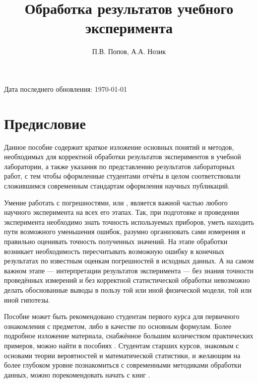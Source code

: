 \documentclass[a5paper,10pt,oneside]{report}
\begin{document}
\title{Обработка результатов учебного эксперимента}
\author{П.В. Попов, А.А. Нозик}

\maketitle


Дата последнего обновления: \today


\tableofcontents

\listoftodos

\chapter*{Предисловие}
    Данное пособие содержит краткое изложение основных понятий и методов,
    необходимых для корректной обработки результатов экспериментов в учебной
    лаборатории, а также указания по представлению результатов лабораторных
    работ, с тем чтобы оформленные студентами отчёты в целом соответствовали
    сложившимся современным стандартам оформления научных публикаций.

    Умение работать с погрешностями, или ,
    является важной частью любого научного эксперимента на всех его этапах.
    Так, при подготовке и проведении эксперимента необходимо знать точность
    используемых приборов, уметь находить пути возможного уменьшения ошибок,
    разумно организовать сами измерения и правильно оценивать точность
    полученных значений. На этапе обработки возникает необходимость пересчитывать
    возможную ошибку в конечных результатах по известным оценкам погрешностей
    в исходных данных. А на самом важном этапе --- интерпретации
    результатов эксперимента --- без знания точности проведённых
    измерений и без корректной статистической обработки невозможно делать
    обоснованные выводы в пользу той или иной физической модели, той или
    иной гипотезы.

    Пособие может быть рекомендовано студентам первого курса для первичного
    ознакомления с предметом, либо в качестве 
    по основным формулам. Более подробное изложение материала, снабжённое
    большим количеством практических примеров, можно найти в пособиях
    \cite{taylor,squires,zaidel}. Студентам старших курсов, знакомым
    с основами теории вероятностей и математической статистики, и желающим
    на более глубоком уровне познакомиться с современными методиками обработки
    данных, можно порекомендовать начать с книг \cite{hudson,idie}.
\end{document}
